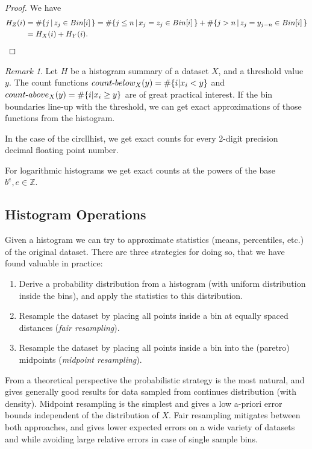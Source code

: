 \documentclass{article}
\theoremstyle{plain}
\theoremstyle{remark}
\newtheorem{remark}[definition]{Remark}
\newcommand{\IZ}{\mathbb{Z}}
\begin{document}
\begin{proof}
  We have
  \begin{align*}
    H_Z(i) &= \# \{ j \, | \, z_j \in Bin[i] \, \} =
    \# \{ j \leq n \, | \, x_j = z_j \in Bin[i] \, \} +
    \# \{ j > n \, | \, z_j = y_{j-n} \in Bin[i] \, \} \\
    &= H_X(i) + H_Y(i). \qedhere
  \end{align*}
\end{proof}

\def\hyph{{\hbox{-}}}

\begin{remark}
  Let $H$ be a histogram summary of a dataset $X$, and a threshold value $y$.  The count functions
  $count\hyph below_X(y) = \#\{ i | x_i < y \}$ and $count\hyph above_X(y) = \#\{ i | x_i \geq y \}$
  are of great practical interest. If the bin boundaries line-up with the threshold, we can
  get exact approximations of those functions from the histogram.

  In the case of the circllhist, we get exact counts for every 2-digit precision decimal floating point number.

  For logarithmic histograms we get exact counts at the powers of the base $b^e, e\in \IZ$.
\end{remark}

\subsection{Histogram Operations}

Given a histogram we can try to approximate statistics (means, percentiles, etc.) of the original dataset.
There are three strategies for doing so, that we have found valuable in practice:

\begin{enumerate}
\item Derive a probability distribution from a histogram (with uniform distribution inside the
  bins), and apply the statistics to this distribution.
\item Resample the dataset by placing all points inside a bin at equally spaced distances ({\it fair resampling}).
\item Resample the dataset by placing all points inside a bin into the (paretro) midpoints ({\it midpoint resampling}).
\end{enumerate}

From a theoretical perspective the probabilistic strategy is the most natural, and gives generally
good results for data sampled from continues distribution (with density).  Midpoint resampling is
the simplest and gives a low a-priori error bounds independent of the distribution of $X$.  Fair
resampling mitigates between both approaches, and gives lower expected errors on a wide variety of
datasets and while avoiding large relative errors in case of single sample bins.
\end{document}

